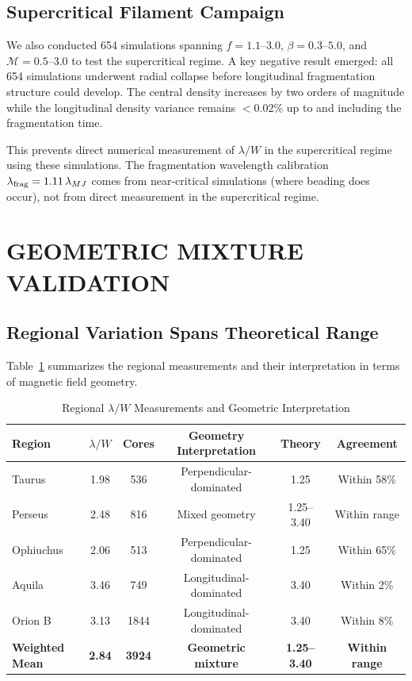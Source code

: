 \documentclass[twoside,twocolumn]{mnras}
\begin{document}
\subsection{Supercritical Filament Campaign}

We also conducted 654 simulations spanning $f = 1.1$--$3.0$, $\beta = 0.3$--$5.0$, and $\mathcal{M} = 0.5$--$3.0$ to test the supercritical regime. A key negative result emerged: all 654 simulations underwent radial collapse before longitudinal fragmentation structure could develop. The central density increases by two orders of magnitude while the longitudinal density variance remains $<0.02\%$ up to and including the fragmentation time.

This prevents direct numerical measurement of $\lambda/W$ in the supercritical regime using these simulations. The fragmentation wavelength calibration $\lambda_{\rm frag} = 1.11\,\lambda_{MJ}$ comes from near-critical simulations (where beading does occur), not from direct measurement in the supercritical regime.

\section{GEOMETRIC MIXTURE VALIDATION}
\label{sec:validation}

\subsection{Regional Variation Spans Theoretical Range}

Table~\ref{tab:validation} summarizes the regional measurements and their interpretation in terms of magnetic field geometry.

\begin{table}
\caption{Regional $\lambda/W$ Measurements and Geometric Interpretation}
\label{tab:validation}
\begin{tabular}{lccccc}
\toprule
Region & $\lambda/W$ & Cores & Geometry Interpretation & Theory & Agreement \\
\midrule
Taurus & 1.98 & 536 & Perpendicular-dominated & 1.25 & Within 58\% \\
Perseus & 2.48 & 816 & Mixed geometry & 1.25--3.40 & Within range \\
Ophiuchus & 2.06 & 513 & Perpendicular-dominated & 1.25 & Within 65\% \\
Aquila & 3.46 & 749 & Longitudinal-dominated & 3.40 & Within 2\% \\
Orion B & 3.13 & 1844 & Longitudinal-dominated & 3.40 & Within 8\% \\
\midrule
\textbf{Weighted Mean} & \textbf{2.84} & \textbf{3924} & \textbf{Geometric mixture} & \textbf{1.25--3.40} & \textbf{Within range} \\
\bottomrule
\end{tabular}
\end{table}
\end{document}
